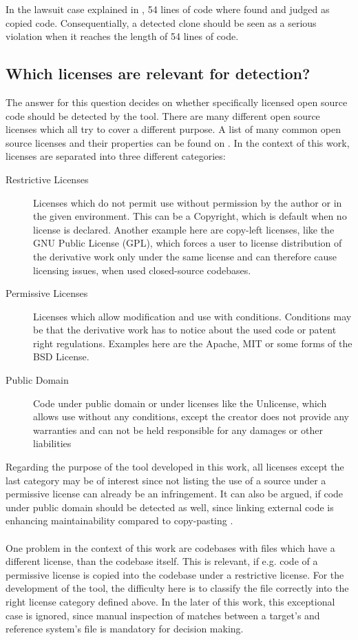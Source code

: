 In the lawsuit case explained in \cite{mertzel2008copying}, 54 lines of code where found and judged as copied code.
Consequentially, a detected clone should be seen as a serious violation when it reaches the length of 54 lines of code.

\subsection*{Which licenses are relevant for detection?}
The answer for this question decides on whether specifically licensed open source code should be detected by the tool.
There are many different open source licenses which all try to cover a different purpose.
A list of many common open source licenses and their properties can be found on \cite{licenses}.
In the context of this work, licenses are separated into three different categories:

\begin{description}
	\item[Restrictive Licenses] Licenses which do not permit use without permission by the author or in the given environment.
		This can be a Copyright, which is default when no license is declared.
		Another example here are copy-left licenses, like the GNU Public License (GPL), which forces a user to license distribution of the derivative work only under the same license and can therefore cause licensing issues, when used closed-source codebases.
	\item[Permissive Licenses]
		Licenses which allow modification and use with conditions.
		Conditions may be that the derivative work has to notice about the used code or patent right regulations.
		Examples here are the Apache, MIT or some forms of the BSD License.
	\item[Public Domain] 
		Code under public domain or under licenses like the Unlicense, which allows use without any conditions, except the creator does not provide any warranties and can not be held responsible for any damages or other liabilities
\end{description}

Regarding the purpose of the tool developed in this work, all licenses except the last category may be of interest since not listing the use of a source under a permissive license can already be an infringement.
It can also be argued, if code under public domain should be detected as well, since linking external code is enhancing maintainability compared to copy-pasting \cite{heinemann2012effective}.
\\ \\
\noindent
One problem in the context of this work are codebases with files which have a different license, than the codebase itself.
This is relevant, if e.g. code of a permissive license is copied into the codebase under a restrictive license.
For the development of the tool, the difficulty here is to classify the file correctly into the right license category defined above.
In the later of this work, this exceptional case is ignored, since manual inspection of matches between a target's and reference system's file is mandatory for decision making.

